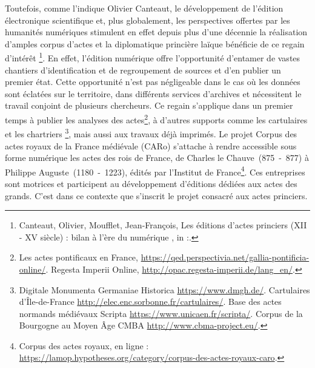 \par Toutefois, comme l'indique Olivier Canteaut, \og le développement de l'édition électronique scientifique et, plus globalement, les perspectives offertes par les humanités numériques stimulent en effet depuis plus d'une décennie la réalisation d'amples corpus d'actes et la diplomatique princière laïque bénéficie de ce regain d'intérêt \fg \footnote{Canteaut, Olivier, Moufflet, Jean-François, \og Les éditions d’actes princiers (\textsc{XII} - \textsc{XV} siècle) : bilan à l’ère du numérique \fg, in :\cite{guyotjeanninJeanBerryEcrit2019}.}. En effet, l'édition numérique offre l'opportunité d'entamer de vastes chantiers d'identification et de regroupement de sources et d'en publier un premier état. Cette opportunité n'est pas négligeable dans le cas où les données sont éclatées sur le territoire, dans différents services d’archives et nécessitent le travail conjoint de plusieurs chercheurs. Ce regain s'applique dans un premier temps à publier les analyses des actes\footnote{Les actes pontificaux en France, \url{https://qed.perspectivia.net/gallia-pontificia-online/}. \newline Regesta Imperii Online, \url{http://opac.regesta-imperii.de/lang_en/}.}, à d'autres supports comme les cartulaires et les chartriers \footnote{Digitale Monumenta Germaniae Historica \url{https://www.dmgh.de/}. \newline Cartulaires d'Île-de-France \url{http://elec.enc.sorbonne.fr/cartulaires/}. \newline Base des actes normands médiévaux Scripta \url{https://www.unicaen.fr/scripta/}. \newline Corpus de la Bourgogne au Moyen Âge CMBA \url{http://www.cbma-project.eu/}.}, mais aussi aux travaux déjà imprimés. Le projet \og Corpus des actes royaux de la France médiévale \fg \space (CARo) s'attache à rendre accessible sous forme numérique les actes des rois de France, de Charles le Chauve~(875~-~877) à Philippe Auguste~(1180~-~1223), édités par l’Institut de France\footnote{Corpus des actes royaux, en ligne : \url{https://lamop.hypotheses.org/category/corpus-des-actes-royaux-caro}.}. Ces entreprises sont motrices et participent au développement d'éditions dédiées aux actes des grands. C'est dans ce contexte que s'inscrit le projet consacré aux actes princiers. 
\newline 

